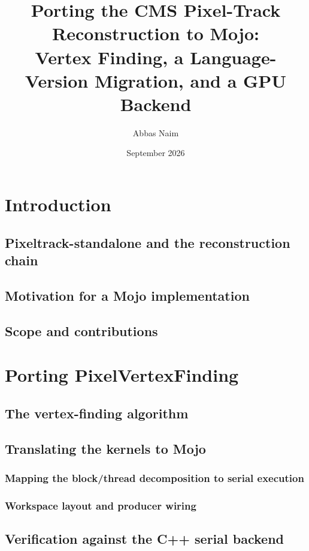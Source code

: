 \documentclass[11pt,a4paper]{report}
\title{Porting the CMS Pixel-Track Reconstruction to Mojo:\\
       Vertex Finding, a Language-Version Migration, and a GPU Backend}
\author{Abbas Naim}
\date{September 2026}
\begin{document}
\maketitle
\tableofcontents

\chapter{Introduction}
\section{Pixeltrack-standalone and the reconstruction chain}
\section{Motivation for a Mojo implementation}
\section{Scope and contributions}

\chapter{Porting PixelVertexFinding}
\section{The vertex-finding algorithm}
\section{Translating the kernels to Mojo}
\subsection{Mapping the block/thread decomposition to serial execution}
\subsection{Workspace layout and producer wiring}
\section{Verification against the C++ serial backend}
\end{document}
